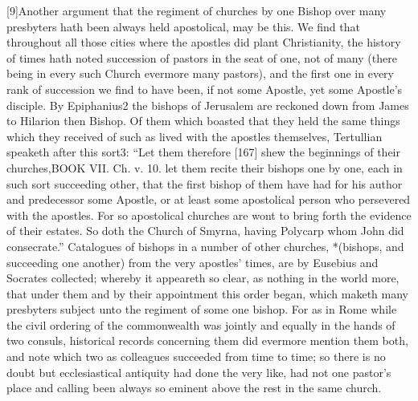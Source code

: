 [9]Another argument that the regiment of churches by one Bishop over many presbyters hath been always held apostolical, may be this. We find that throughout all those cities where the apostles did plant Christianity, the history of times hath noted succession of pastors in the seat of one, not of many (there being in every such Church evermore many pastors), and the first one in every rank of succession we find to have been, if not some Apostle, yet some Apostle’s disciple. By Epiphanius2 the bishops of Jerusalem are reckoned down from James to Hilarion then Bishop. Of them which boasted that they held the same things which they received of such as lived with the apostles themselves, Tertullian speaketh after this sort3: “Let them therefore [167] shew the beginnings of their churches,BOOK VII. Ch. v. 10. let them recite their bishops one by one, each in such sort succeeding other, that the first bishop of them have had for his author and predecessor some Apostle, or at least some apostolical person who persevered with the apostles. For so apostolical churches are wont to bring forth the evidence of their estates. So doth the Church of Smyrna, having Polycarp whom John did consecrate.” Catalogues of bishops in a number of other churches, *(bishops, and succeeding one another) from the very apostles’ times, are by Eusebius and Socrates collected; whereby it appeareth so clear, as nothing in the world more, that under them and by their appointment this order began, which maketh many presbyters subject unto the regiment of some one bishop. For as in Rome while the civil ordering of the commonwealth was jointly and equally in the hands of two consuls, historical records concerning them did evermore mention them both, and note which two as colleagues succeeded from time to time; so there is no doubt but ecclesiastical antiquity had done the very like, had not one pastor’s place and calling been always so eminent above the rest in the same church.

